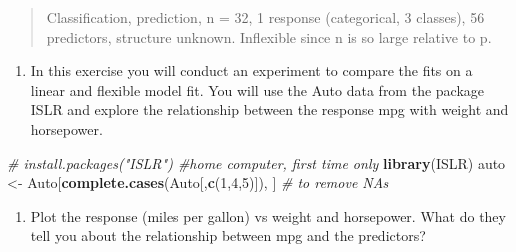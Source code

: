 \documentclass[]{article}
\newenvironment{Shaded}{\begin{snugshade}}{\end{snugshade}}
\newcommand{\CommentTok}[1]{\textcolor[rgb]{0.56,0.35,0.01}{\textit{#1}}}
\newcommand{\DataTypeTok}[1]{\textcolor[rgb]{0.13,0.29,0.53}{#1}}
\newcommand{\DecValTok}[1]{\textcolor[rgb]{0.00,0.00,0.81}{#1}}
\newcommand{\KeywordTok}[1]{\textcolor[rgb]{0.13,0.29,0.53}{\textbf{#1}}}
\newcommand{\NormalTok}[1]{#1}
\newcommand{\OperatorTok}[1]{\textcolor[rgb]{0.81,0.36,0.00}{\textbf{#1}}}
\newcommand{\StringTok}[1]{\textcolor[rgb]{0.31,0.60,0.02}{#1}}
\providecommand{\tightlist}{%
  \setlength{\itemsep}{0pt}\setlength{\parskip}{0pt}}
\begin{document}
\begin{quote}
Classification, prediction, n = 32, 1 response (categorical, 3 classes),
56 predictors, structure unknown. Inflexible since n is so large
relative to p.
\end{quote}

\begin{enumerate}
\def\labelenumi{\arabic{enumi}.}
\setcounter{enumi}{4}
\tightlist
\item
  In this exercise you will conduct an experiment to compare the fits on
  a linear and flexible model fit. You will use the Auto data from the
  package ISLR and explore the relationship between the response mpg
  with weight and horsepower.
\end{enumerate}

\begin{Shaded}
\begin{Highlighting}[]
\CommentTok{# install.packages("ISLR") #home computer, first time only}
\KeywordTok{library}\NormalTok{(ISLR)}
\NormalTok{auto <-}\StringTok{ }\NormalTok{Auto[}\KeywordTok{complete.cases}\NormalTok{(Auto[,}\KeywordTok{c}\NormalTok{(}\DecValTok{1}\NormalTok{,}\DecValTok{4}\NormalTok{,}\DecValTok{5}\NormalTok{)]), ] }\CommentTok{# to remove NAs}
\end{Highlighting}
\end{Shaded}

\begin{enumerate}
\def\labelenumi{(\alph{enumi})}
\tightlist
\item
  Plot the response (miles per gallon) vs weight and horsepower. What do
  they tell you about the relationship between mpg and the predictors?
\end{enumerate}

\begin{Shaded}
\end{Shaded}
\end{document}
